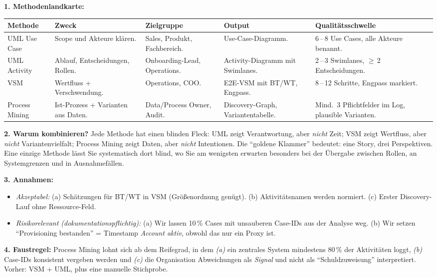 \documentclass[11pt,a4paper,oneside]{article}
\begin{document}
\begin{loesungbox}
\textbf{1. Methodenlandkarte:}

\smallskip
\begin{tabularx}{\linewidth}{@{}p{2.4cm}XXXX@{}}
\toprule
\textbf{Methode} & \textbf{Zweck} & \textbf{Zielgruppe} & \textbf{Output} & \textbf{Qualit\"ats\-schwelle} \\
\midrule
UML Use Case   & Scope und Akteure kl\"aren. & Sales, Produkt, Fachbereich. & Use-Case-Diagramm. & 6\,--\,8 Use Cases, alle Akteure benannt. \\
\midrule
UML Activity   & Ablauf, Entscheidungen, Rollen. & Onboarding-Lead, Operations. & Activity-Diagramm mit Swimlanes. & 2\,--\,3 Swimlanes, $\geq$\,2 Entscheidungen. \\
\midrule
VSM            & Wertfluss + Verschwendung. & Operations, COO. & E2E-VSM mit BT/WT, Engpass. & 8\,--\,12 Schritte, Engpass markiert. \\
\midrule
Process Mining & Ist-Prozess + Varianten aus Daten. & Data/Process Owner, Audit. & Discovery-Graph, Variantentabelle. & Mind.\ 3 Pflichtfelder im Log, plausible Varianten. \\
\bottomrule
\end{tabularx}

\smallskip
\textbf{2. Warum kombinieren?}
Jede Methode hat einen blinden Fleck: UML zeigt Verantwortung, aber \emph{nicht} Zeit; VSM zeigt Wertfluss, aber \emph{nicht} Varianten\-vielfalt; Process Mining zeigt Daten, aber \emph{nicht} Intentionen. Die ``goldene Klammer'' bedeutet: eine Story, drei Perspektiven. Eine einzige Methode l\"asst Sie systematisch dort blind, wo Sie am wenigsten erwarten \textendash{} besonders bei der \"Ubergabe zwischen Rollen, an Systemgrenzen und in Ausnahmef\"allen.

\smallskip
\textbf{3. Annahmen:}
\begin{itemize}
  \item \emph{Akzeptabel:} (a) Sch\"atzungen f\"ur BT/WT in VSM (Gr\"o{\ss}enordnung gen\"ugt). (b) Aktivit\"atsnamen werden normiert. (c) Erster Discovery-Lauf ohne Ressource-Feld.
  \item \emph{Risikorelevant (dokumentationspflichtig):} (a) Wir lassen 10\,\% Cases mit unsauberen Case-IDs aus der Analyse weg. (b) Wir setzen ``Provisioning bestanden'' = Timestamp \emph{Account aktiv}, obwohl das nur ein Proxy ist.
\end{itemize}

\smallskip
\textbf{4. Faustregel:}
Process Mining lohnt sich ab dem Reifegrad, in dem \emph{(a)} ein zentrales System mindestens 80\,\% der Aktivit\"aten loggt, \emph{(b)} Case-IDs konsistent vergeben werden und \emph{(c)} die Organisation Abweichungen als \emph{Signal} und nicht als ``Schuldzuweisung'' interpretiert. Vorher: VSM + UML, plus eine manuelle Stichprobe.
\end{loesungbox}
\end{document}
